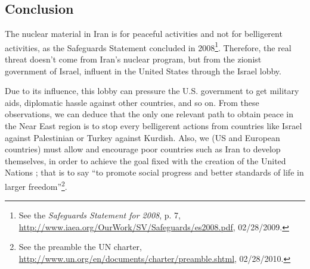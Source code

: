 \documentclass[
paper=a4,
fontsize=10pt,
headsepline,
headings=normal,
version=last,
footinclude=true,
mpinclude=true,
fleqn
]{scrartcl}
\begin{document}
\textcolor{spot}{\section{Conclusion}}

The nuclear material in Iran is for peaceful activities and not for belligerent activities, as the Safeguards Statement concluded in 2008\footnote{See the \emph{Safeguards Statement for 2008}, p. 7, \url{http://www.iaea.org/OurWork/SV/Safeguards/es2008.pdf}, 02/28/2009.}. Therefore, the real threat doesn't come from Iran's nuclear program, but from the zionist government of Israel, influent in the United States through the Israel lobby.

Due to its influence, this lobby can pressure the U.S. government to get military aids, diplomatic hassle against other countries, and so on. From these observations, we can deduce that the only one relevant path to obtain peace in the Near East region is to stop every belligerent actions from countries like Israel against Palestinian or Turkey against Kurdish. Also, we (US and European countries) must allow and encourage poor countries such as Iran to develop themselves, in order to achieve the goal fixed with the creation of the United Nations ; that is to say \textquotedblleft to promote social progress and better standards of life in larger freedom\textquotedblright\footnote{See the preamble the UN charter, \url{http://www.un.org/en/documents/charter/preamble.shtml}, 02/28/2010.}.
\end{document}
